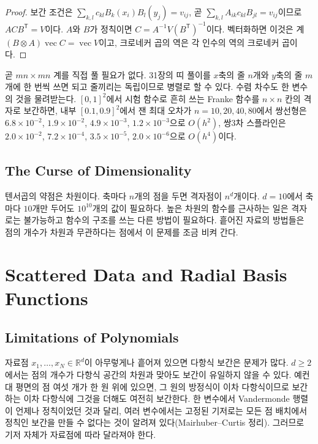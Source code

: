 \begin{proof}
보간 조건은 $\sum_{k,l}c_{kl}B_k(x_i)B_l(y_j)=v_{ij}$, 곧 $\sum_{k,l}A_{ik}c_{kl}B_{jl}=v_{ij}$이므로 $ACB^{\mathsf T}=V$이다. $A$와 $B$가 정칙이면 $C=A^{-1}V(B^{\mathsf T})^{-1}$이다. 벡터화하면 이것은 계 $(B\otimes A)\operatorname{vec}C=\operatorname{vec}V$이고, 크로네커 곱의 역은 각 인수의 역의 크로네커 곱이다.
\end{proof}

곧 $mn\times mn$ 계를 직접 풀 필요가 없다. 31장의 띠 풀이를 $x$축의 줄 $n$개와 $y$축의 줄 $m$개에 한 번씩 쓰면 되고 줄끼리는 독립이므로 병렬로 할 수 있다. 수렴 차수도 한 변수의 것을 물려받는다. $[0,1]^2$에서 시험 함수로 흔히 쓰는 Franke 함수\cite{franke1982}를 $n\times n$ 칸의 격자로 보간하면, 내부 $[0.1,0.9]^2$에서 잰 최대 오차가 $n=10,20,40,80$에서 쌍선형은 $6.8\times10^{-2}$, $1.9\times10^{-2}$, $4.9\times10^{-3}$, $1.2\times10^{-3}$으로 $O(h^2)$, 쌍3차 스플라인은 $2.0\times10^{-2}$, $7.2\times10^{-4}$, $3.5\times10^{-5}$, $2.0\times10^{-6}$으로 $O(h^4)$이다.

\subsection{The Curse of Dimensionality}

텐서곱의 약점은 차원이다. 축마다 $n$개의 점을 두면 격자점이 $n^d$개이다. $d=10$에서 축마다 $10$개만 두어도 $10^{10}$개의 값이 필요하다. 높은 차원의 함수를 근사하는 일은 격자로는 불가능하고 함수의 구조를 쓰는 다른 방법이 필요하다. 흩어진 자료의 방법들은 점의 개수가 차원과 무관하다는 점에서 이 문제를 조금 비켜 간다.

\section{Scattered Data and Radial Basis Functions}
\label{sec:rbf}

\subsection{Limitations of Polynomials}

자료점 $x_1,\dots,x_N\in\mathbb R^d$이 아무렇게나 흩어져 있으면 다항식 보간은 문제가 많다. $d\ge2$에서는 점의 개수가 다항식 공간의 차원과 맞아도 보간이 유일하지 않을 수 있다. 예컨대 평면의 점 여섯 개가 한 원 위에 있으면, 그 원의 방정식이 이차 다항식이므로 보간하는 이차 다항식에 그것을 더해도 여전히 보간한다. 한 변수에서 Vandermonde 행렬이 언제나 정칙이었던 것과 달리, 여러 변수에서는 고정된 기저로는 모든 점 배치에서 정칙인 보간을 만들 수 없다는 것이 알려져 있다(Mairhuber--Curtis 정리\cite{wendland2004}). 그러므로 기저 자체가 자료점에 따라 달라져야 한다.

